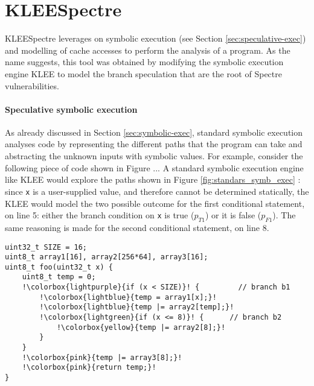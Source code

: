 \documentclass[12pt,a4paper]{book}
\theoremstyle{definition}
\begin{document}
	\section{KLEESpectre}\label{sec:kleespectre}
	KLEESpectre \cite{Wang2019} leverages on symbolic execution (see Section \ref{sec:speculative-exec}) and modelling of cache accesses to perform the analysis of a program. As the name suggests, this tool was obtained by modifying the symbolic execution engine KLEE \cite{Cadar2008} to model the branch speculation that are the root of Spectre vulnerabilities. 
	\paragraph{Speculative symbolic execution} As already discussed in Section \ref{sec:symbolic-exec}, standard symbolic execution analyses code by representing the different paths that the program can take and abstracting the unknown inputs with symbolic values. For example, consider the following piece of code shown in Figure ... A standard symbolic execution engine like KLEE would explore the paths shown in Figure \ref{fig:standars_symb_exec} : since \texttt{x} is a user-supplied value, and therefore cannot be determined statically, the KLEE would model the two possible outcome for the first conditional statement, on line 5: either the branch condition on \texttt{x} is true ($p_{T1}$) or it is false ($p_{F1}$). The same reasoning is made for the second conditional statement, on line 8.
	\begin{lstlisting}[escapechar=!]
uint32_t SIZE = 16; 
uint8_t array1[16], array2[256*64], array3[16];
uint8_t foo(uint32_t x) { 
	uint8_t temp = 0; 
	!\colorbox{lightpurple}{if (x < SIZE)}! {		  // branch b1
		!\colorbox{lightblue}{temp = array1[x];}!
		!\colorbox{lightblue}{temp |= array2[temp];}!
		!\colorbox{lightgreen}{if (x <= 8)}! {		// branch b2
			!\colorbox{yellow}{temp |= array2[8];}!
		}	
	}
	!\colorbox{pink}{temp |= array3[8];}!
	!\colorbox{pink}{return temp;}!
}
	\end{lstlisting}
\end{document}
